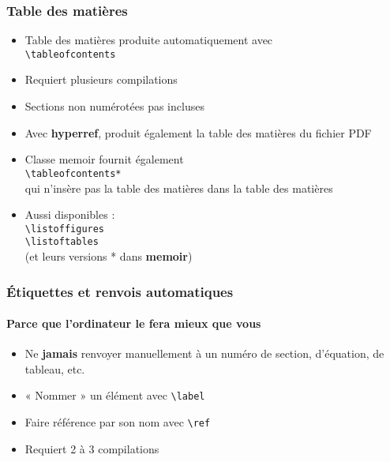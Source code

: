 \begin{frame}[fragile]

	\frametitle{Table des matières}
	
	\begin{itemize}
		\item Table des matières produite automatiquement avec \\
		\lstinline|\tableofcontents|
		\item Requiert plusieurs compilations
		\item Sections non numérotées pas incluses
		\item Avec \textbf{hyperref}, produit également la table des matières du fichier PDF
		
		\pause
		
		\item Classe memoir fournit également \\
		\lstinline|\tableofcontents*| \\
		qui n’insère pas la table des matières dans la table des matières
		
		\pause
		
		\item Aussi disponibles : \\
		\lstinline|\listoffigures| \\
		\lstinline|\listoftables| \\
		(et leurs versions * dans \textbf{memoir})
	\end{itemize}
\end{frame}


\begin{frame}[c,fragile]
	
	\frametitle{Étiquettes et renvois automatiques}
	\framesubtitle{Parce que l'ordinateur le fera mieux que vous}
	
	\begin{itemize}
		\item Ne \textbf{jamais} renvoyer manuellement à un numéro de section,
		d’équation, de tableau, etc.
		\item « Nommer » un élément avec \lstinline|\label|
		\item Faire référence par son nom avec \lstinline|\ref|
		\item Requiert 2 à 3 compilations
	\end{itemize}
\end{frame}

